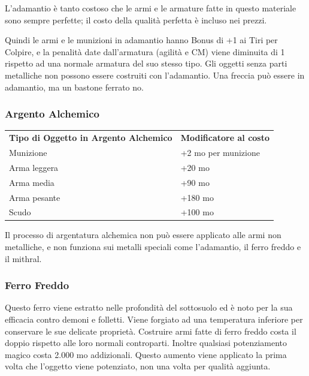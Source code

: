 \documentclass[a4paper,11pt,twoside,openany]{book}
\begin{document}
L'adamantio è tanto costoso che le armi e le armature fatte in questo materiale sono sempre perfette; il costo della qualità perfetta è incluso nei prezzi.

Quindi le armi e le munizioni in adamantio hanno Bonus di +1 ai Tiri per Colpire, e la penalità date dall'armatura (agilità e CM) viene diminuita di 1 rispetto ad una normale armatura del suo stesso tipo. Gli oggetti senza parti metalliche non possono essere costruiti con l'adamantio. Una freccia può essere in adamantio, ma un bastone ferrato
no.

\subsubsection{Argento Alchemico}

\label{argento-alchemico}

\begin{tabular}{ll}
	\toprule
	\textbf{Tipo di Oggetto in Argento Alchemico} & \textbf{Modificatore al costo}\\
	Munizione                      & +2 mo per munizione\\
	Arma leggera                   & +20 mo\\
	Arma media                     & +90 mo\\
	Arma pesante                   & +180 mo\\
	Scudo                         & +100 mo\\
\end{tabular}

Il processo di argentatura alchemica non può essere applicato alle armi non metalliche, e non funziona sui metalli speciali come l'adamantio, il ferro freddo e il mithral.

\subsubsection{Ferro Freddo}

\label{ferro-freddo}

Questo ferro viene estratto nelle profondità del sottosuolo ed è noto per la sua efficacia contro demoni e folletti. Viene forgiato ad una temperatura inferiore per conservare le sue delicate proprietà. Costruire armi fatte di ferro freddo costa il doppio rispetto alle loro normali controparti. Inoltre qualsiasi potenziamento magico costa 2.000 mo addizionali. Questo aumento viene applicato la prima volta che l'oggetto viene potenziato, non una volta per qualità aggiunta.
\end{document}
